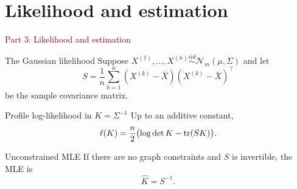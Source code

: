 \documentclass[dvipsnames,aspectratio=169,handout]{beamer}
\begin{document}
%
%


\section{Likelihood and estimation}

\begin{frame}{}
\begin{center}
{\Huge \textcolor{DarkRed}{Part 3: Likelihood and estimation}}
\end{center}
\end{frame}

\begin{frame}{The Gaussian likelihood}
Suppose $X^{(1)},\ldots,X^{(n)}\overset{iid}{\sim}\mathcal N_m(\mu,\Sigma)$ and let
\[
S=\frac{1}{n}\sum_{k=1}^n (X^{(k)}-\bar X)(X^{(k)}-\bar X)^\top
\]
be the sample covariance matrix.

\begin{block}{Profile log-likelihood in $K=\Sigma^{-1}$}
Up to an additive constant,
\[
\ell(K)=\frac{n}{2}\bigl(\log\det K-\operatorname{tr}(SK)\bigr).
\]
\end{block}

\begin{alertblock}{Unconstrained MLE}
If there are no graph constraints and $S$ is invertible, the MLE is
\[
\hat K=S^{-1}.
\]
\end{alertblock}
\end{frame}
\end{document}
